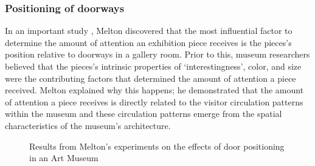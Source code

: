 \documentclass[12pt]{ucthesis}
\begin{document}
\subsubsection{Positioning of doorways}
In an important study \cite{Melton}, Melton discovered that the most influential factor to determine  the amount of attention an exhibition piece receives is the pieces's position relative to doorways in a gallery room. Prior to this, museum researchers believed that the pieces's intrinsic properties of `interestingness', color, and size were the contributing factors that determined the amount of attention a piece received. Melton explained why this happens; he demonstrated that the amount of attention a piece receives is directly related to the visitor circulation patterns within the museum and these circulation patterns emerge from the spatial characteristics of the museum's architecture.

\begin{figure}[H]
 \centering
 \hspace{10 mm}
 \label{melton}
 \caption{Results from Melton's experiments on the effects of door positioning in an Art Museum}
\label{Melton-studies}
\end{figure}
\end{document}

